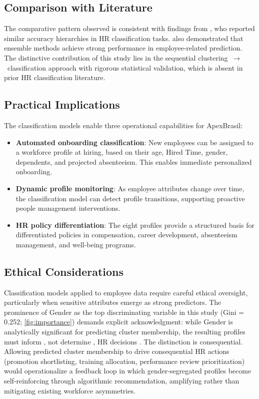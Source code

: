 \documentclass[alpha-refs,english]{RBCA_v3.0}
\begin{document}
\subsection{Comparison with Literature}
The comparative pattern observed is consistent with findings from \cite{Alsaadi2022}, who reported similar accuracy hierarchies in HR classification tasks. \cite{Fallucchi2020} also demonstrated that ensemble methods achieve strong performance in employee-related prediction. The distinctive contribution of this study lies in the sequential clustering~$\rightarrow$~classification approach with rigorous statistical validation, which is absent in prior HR classification literature.

\subsection{Practical Implications}
The classification models enable three operational capabilities for ApexBrasil:

\begin{itemize}
    \item \textbf{Automated onboarding classification}: New employees can be assigned to a workforce profile at hiring, based on their age, Hired Time, gender, dependents, and projected absenteeism. This enables immediate personalized onboarding.
    \item \textbf{Dynamic profile monitoring}: As employee attributes change over time, the classification model can detect profile transitions, supporting proactive people management interventions.
    \item \textbf{HR policy differentiation}: The eight profiles provide a structured basis for differentiated policies in compensation, career development, absenteeism management, and well-being programs.
\end{itemize}

\subsection{Ethical Considerations}
\label{sec:ethics}

Classification models applied to employee data require careful 
ethical oversight, particularly when sensitive attributes emerge as 
strong predictors. The prominence of Gender as the top discriminating 
variable in this study (Gini = 0.252; \cref{fig:importance}) 
demands explicit acknowledgment: while Gender is analytically 
significant for predicting cluster membership, the resulting profiles 
must inform , not determine , HR decisions \citep{Tursunbayeva2022}. 
The distinction is consequential. Allowing predicted cluster 
membership to drive consequential HR actions (promotion shortlisting, 
training allocation, performance review prioritization) would 
operationalize a feedback loop in which gender-segregated profiles 
become self-reinforcing through algorithmic recommendation, 
amplifying rather than mitigating existing workforce asymmetries.
\end{document}
